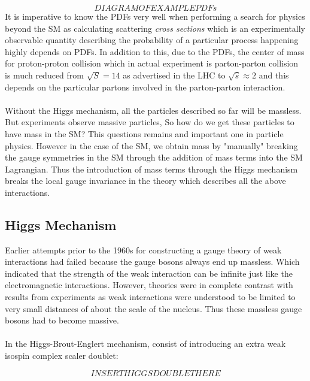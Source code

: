 \begin{equation}
 DIAGRAM OF EXAMPLE PDFs
\end{equation}
It is imperative to know the PDFs very well when performing a search for physics beyond the SM as calculating scattering \textit{cross sections} which is an experimentally observable quantity describing the probability of a particular process happening highly depends on PDFs. In addition to this, due to the PDFs, the center of mass for proton-proton collision which in actual experiment is parton-parton collision is much reduced from $\sqrt{S} = 14$ \TeV as advertised in the LHC to $\sqrt{\hat{s}} \approx 2$ \TeV and this depends on the particular partons involved in the parton-parton interaction.


\paragraph*{}
Without the Higgs mechanism, all the particles described so far will be massless. But experiments observe massive particles, So how do we get these particles to have mass in the SM?
This questions remains and important one in particle physics. However in the case of the SM, we obtain mass by "manually" breaking the gauge symmetries in the SM through the addition of mass terms into the SM Lagrangian. Thus the introduction of mass terms through the Higgs mechanism breaks the local gauge invariance in the theory which describes all the above interactions.
\subsection*{Higgs Mechanism}
Earlier attempts prior to the 1960s for constructing a gauge theory of weak interactions had failed because the gauge bosons always end up massless. Which indicated that the strength of the weak interaction can be infinite just like the electromagnetic interactions. However, theories were in complete contrast with results from experiments as weak interactions were understood to be limited to very small distances of about the scale of the nucleus. Thus these massless gauge bosons had to become massive.
\paragraph*{}
In the Higgs-Brout-Englert \cite{} mechanism, consist of introducing an extra weak isospin complex scaler doublet:

\begin{equation}
INSERT HIGGS DOUBLET HERE 
\end{equation}

